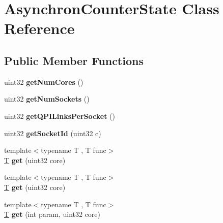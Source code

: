 \hypertarget{class_asynchron_counter_state}{}\section{Asynchron\+Counter\+State Class Reference}
\label{class_asynchron_counter_state}
\subsection*{Public Member Functions}
\begin{DoxyCompactItemize}
\item 
\mbox{\label{class_asynchron_counter_state_ae50ebd3674b3ba52ff25f46b4eeb3956}} 
uint32 {\bfseries get\+Num\+Cores} ()
\item 
\mbox{\label{class_asynchron_counter_state_aad5f8ed144ee05d32c4b82e8664ea294}} 
uint32 {\bfseries get\+Num\+Sockets} ()
\item 
\mbox{\label{class_asynchron_counter_state_ab221a101212adceb2a248691eca8db1a}} 
uint32 {\bfseries get\+Q\+P\+I\+Links\+Per\+Socket} ()
\item 
\mbox{\label{class_asynchron_counter_state_a9121ce142b39fd845f6c4eb101c214bf}} 
uint32 {\bfseries get\+Socket\+Id} (uint32 c)
\item 
\mbox{\label{class_asynchron_counter_state_a8f8e4539b38c5f171faa235b196e6f6a}} 
{\footnotesize template$<$typename T , T  func$>$ }\\\mbox{\hyperlink{struct_t}{T}} {\bfseries get} (uint32 core)
\item 
\mbox{\label{class_asynchron_counter_state_a8f8e4539b38c5f171faa235b196e6f6a}} 
{\footnotesize template$<$typename T , T  func$>$ }\\\mbox{\hyperlink{struct_t}{T}} {\bfseries get} (uint32 core)
\item 
\mbox{\label{class_asynchron_counter_state_aa77c2086bbaa8214dc60176f6ba08e43}} 
{\footnotesize template$<$typename T , T  func$>$ }\\\mbox{\hyperlink{struct_t}{T}} {\bfseries get} (int param, uint32 core)

\end{DoxyCompactItemize}
